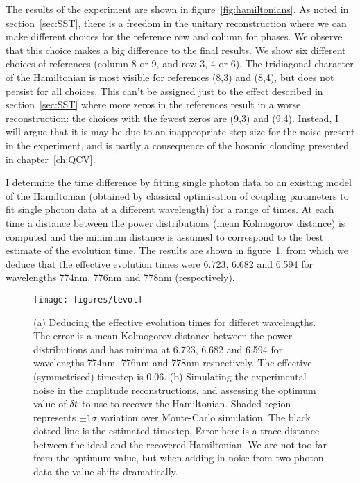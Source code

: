 The results of the experiment are shown in figure~\ref{fig:hamiltonians}.
As noted in section~\ref{sec:SST}, there is a freedom in the unitary
reconstruction where we can make different choices for the reference row and
column for phases. We observe that this choice makes a big difference to the
final results. We show six
different choices of references (column 8 or 9, and row 3, 4 or 6). The
tridiagonal character of the Hamiltonian is most visible for references (8,3)
and (8,4), but does not persist for all choices. This can't be assigned just to
the effect described in section~\ref{sec:SST} where more zeros in the references
result in a worse reconstruction: the choices with the fewest zeros are (9,3)
and (9.4). Instead, I will argue that it is may be due to an inappropriate step
size for the noise present in the experiment, and is partly a consequence of the
bosonic clouding presented in chapter~\ref{ch:QCV}.

I determine the time difference by fitting single photon data to an existing
model of the Hamiltonian (obtained by classical optimisation of coupling
parameters to fit single photon data at a different wavelength)
for a range of times. At each time a distance between the power
distributions (mean Kolmogorov distance) is computed and the minimum distance is
assumed to correspond to the best estimate of the evolution time. The results
are shown in figure~\ref{fig:tevol}, from which we deduce that the effective
evolution times were 6.723, 6.682 and 6.594 for wavelengths 774nm, 776nm and
778nm (respectively).

\begin{figure}
  \centering
  \texttt{[image: figures/tevol]}
  \caption[Deducing the effective evolution times for different wavelengths]
  {(a) Deducing the effective evolution times for differet wavelengths. The
  error is a mean Kolmogorov distance between the power distributions and has
  minima at 6.723, 6.682 and 6.594 for wavelengths 774nm, 776nm and 778nm
  respectively. The effective (symmetrised) timestep is 0.06. (b) Simulating the
  experimental noise in the amplitude reconstructions, and assessing the optimum
  value of \(\delta t\) to use to recover the Hamiltonian. Shaded region represents
  \(\pm 1 \sigma\) variation over Monte-Carlo simulation. The black dotted line
  is the estimated timestep. Error here is a trace distance between the ideal
  and the recovered Hamiltonian. We are not too far from the optimum value, but
  when adding in noise from two-photon data the value shifts dramatically.}
  \label{fig:tevol}
\end{figure}

